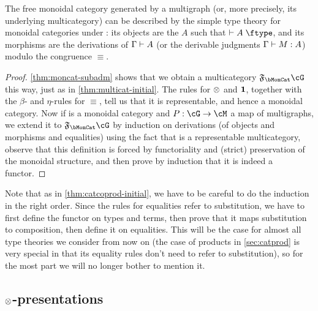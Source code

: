 \begin{thm}\label{thm:moncat-initial}
  The free monoidal category generated by a multigraph \cG (or, more precisely, its underlying multicategory) can be described by the simple type theory for monoidal categories under \cG: its objects are the $A$ such that $\types A\type$, and its morphisms are the derivations of $\Gamma\vdash A$ (or the derivable judgments $\Gamma\vdash M:A$) modulo the congruence $\equiv$.
\end{thm}
\begin{proof}
  \cref{thm:moncat-subadm} shows that we obtain a multicategory $\F\bMonCat\cG$ this way, just as in \cref{thm:multicat-initial}.
  The rules for $\otimes$ and $\mathbf{1}$, together with the $\beta$- and $\eta$-rules for $\equiv$, tell us that it is representable, and hence a monoidal category.
  Now if \cM is a monoidal category and $P:\cG\to\cM$ a map of multigraphs, we extend it to $\F\bMonCat\cG$ by induction on derivations (of objects and morphisms and equalities) using the fact that \cM is a representable multicategory, observe that this definition is forced by functoriality and (strict) preservation of the monoidal structure, and then prove by induction that it is indeed a functor.
\end{proof}

Note that as in \cref{thm:catcoprod-initial}, we have to be careful to do the induction in the right order.
Since the rules for equalities refer to substitution, we have to first define the functor on types and terms, then prove that it maps substitution to composition, then define it on equalities.
This will be the case for almost all type theories we consider from now on (the case of products in \cref{sec:catprod} is very special in that its equality rules don't need to refer to substitution), so for the most part we will no longer bother to mention it.

\subsection{$\otimes$-presentations}
\label{sec:tensor-presentations}

